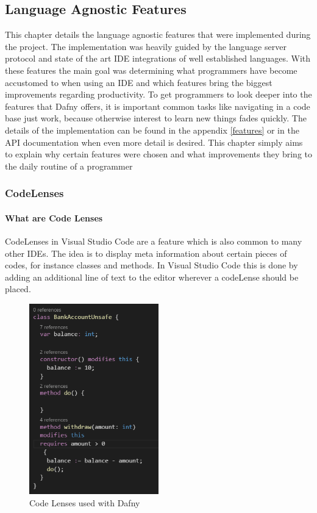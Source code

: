 \subsection{Language Agnostic Features}\label{agfeatures}
This chapter details the language agnostic features that were implemented during the project. The implementation was heavily guided by the language server protocol and state of the art IDE integrations of well established languages. With these features the main goal was determining what programmers have become accustomed to when using an IDE and which features bring the biggest improvements regarding productivity. To get programmers to look deeper into the features that Dafny offers, it is important common tasks like navigating in a code base just work, because otherwise interest to learn new things fades quickly. \newline
The details of the implementation can be found in the appendix \ref{features} or in the API documentation when even more detail is desired. This chapter simply aims to explain why certain features were chosen and what improvements they bring to the daily routine of a programmer \newline

\subsubsection{CodeLenses} \label{agcodelenses}

\paragraph{What are Code Lenses}
CodeLenses in Visual Studio Code are a feature which is also common to many other IDEs. The idea is to display meta information about certain pieces of codes, for instance classes and methods. In Visual Studio Code this is done  by adding an additional line of text to the editor wherever a codeLense should  be placed. \newline
\begin{figure}[H]
	\centering
	\includegraphics[width=0.5\textwidth]{img/codelensesClosed}
	\caption{Code Lenses used with Dafny}
	\label{fig:agcodelensesclosed}
\end{figure}

